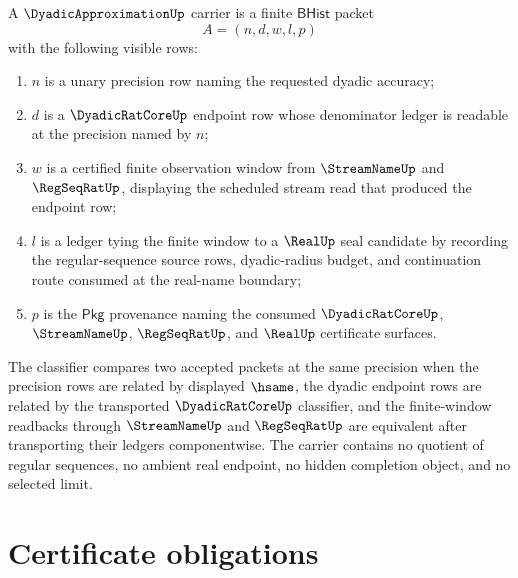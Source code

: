 \begin{definition}
\label{def:dyadic-approximation-carrier}
A $\DyadicApproximationUp$ carrier is a finite $\mathsf{BHist}$ packet
$$
A=(n,d,w,l,p)
$$
with the following visible rows:
\begin{enumerate}
\item $n$ is a unary precision row naming the requested dyadic accuracy;
\item $d$ is a $\DyadicRatCoreUp$ endpoint row whose denominator ledger is readable at the precision named by $n$;
\item $w$ is a certified finite observation window from $\StreamNameUp$ and $\RegSeqRatUp$, displaying the scheduled stream read that produced the endpoint row;
\item $l$ is a ledger tying the finite window to a $\RealUp$ seal candidate by recording the regular-sequence source rows, dyadic-radius budget, and continuation route consumed at the real-name boundary;
\item $p$ is the $\mathsf{Pkg}$ provenance naming the consumed $\DyadicRatCoreUp$, $\StreamNameUp$, $\RegSeqRatUp$, and $\RealUp$ certificate surfaces.
\end{enumerate}
The classifier compares two accepted packets at the same precision when the precision rows are related by displayed $\hsame$, the dyadic endpoint rows are related by the transported $\DyadicRatCoreUp$ classifier, and the finite-window readbacks through $\StreamNameUp$ and $\RegSeqRatUp$ are equivalent after transporting their ledgers componentwise. The carrier contains no quotient of regular sequences, no ambient real endpoint, no hidden completion object, and no selected limit.
\end{definition}

\section{Certificate obligations}
\label{sec:dyadicapproximation-certificate-obligations}

